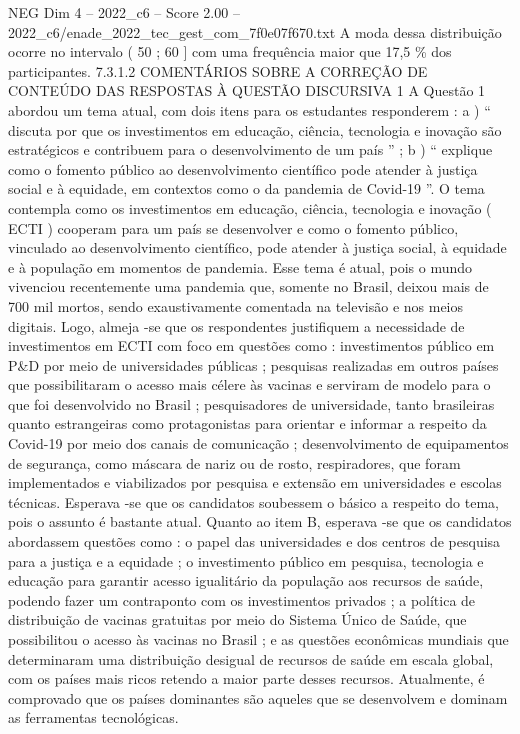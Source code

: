 \begin{textsample}{NEG Dim 4 – 2022\_c6 – Score 2.00 – 2022\_c6/enade\_2022\_tec\_gest\_com\_7f0e07f670.txt}
A moda dessa distribuição ocorre no intervalo ( 50 ; 60 ] com uma frequência maior que 17,5 \% dos participantes. 7.3.1.2 COMENTÁRIOS SOBRE A CORREÇÃO DE CONTEÚDO DAS RESPOSTAS À QUESTÃO DISCURSIVA 1 A Questão 1 abordou um tema atual, com dois itens para os estudantes responderem : a ) “ discuta por que os investimentos em educação, ciência, tecnologia e inovação são estratégicos e contribuem para o desenvolvimento de um país ” ; b ) “ explique como o fomento público ao desenvolvimento científico pode atender à justiça social e à equidade, em contextos como o da pandemia de Covid-19 ”.
O tema contempla como os investimentos em educação, ciência, tecnologia e inovação ( ECTI ) cooperam para um país se desenvolver e como o fomento público, vinculado ao desenvolvimento científico, pode atender à justiça social, à equidade e à população em momentos de pandemia.
Esse tema é atual, pois o mundo vivenciou recentemente uma pandemia que, somente no Brasil, deixou mais de 700 mil mortos, sendo exaustivamente comentada na televisão e nos meios digitais.
Logo, almeja -se que os respondentes justifiquem a necessidade de investimentos em ECTI com foco em questões como : investimentos público em P\&D por meio de universidades públicas ; pesquisas realizadas em outros países que possibilitaram o acesso mais célere às vacinas e serviram de modelo para o que foi desenvolvido no Brasil ; pesquisadores de universidade, tanto brasileiras quanto estrangeiras como protagonistas para orientar e informar a respeito da Covid-19 por meio dos canais de comunicação ; desenvolvimento de equipamentos de segurança, como máscara de nariz ou de rosto, respiradores, que foram implementados e viabilizados por pesquisa e extensão em universidades e escolas técnicas.
Esperava -se que os candidatos soubessem o básico a respeito do tema, pois o assunto é bastante atual.
Quanto ao item B, esperava -se que os candidatos abordassem questões como : o papel das universidades e dos centros de pesquisa para a justiça e a equidade ; o investimento público em pesquisa, tecnologia e educação para garantir acesso igualitário da população aos recursos de saúde, podendo fazer um contraponto com os investimentos privados ; a política de distribuição de vacinas gratuitas por meio do Sistema Único de Saúde, que possibilitou o acesso às vacinas no Brasil ; e as questões econômicas mundiais que determinaram uma distribuição desigual de recursos de saúde em escala global, com os países mais ricos retendo a maior parte desses recursos.
Atualmente, é comprovado que os países dominantes são aqueles que se desenvolvem e dominam as ferramentas tecnológicas.

\end{textsample}
